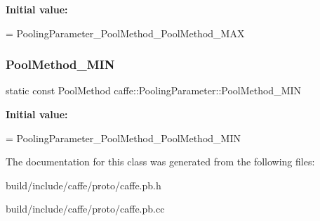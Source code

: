 {\bfseries Initial value\+:}
\begin{DoxyCode}
=
    PoolingParameter\_PoolMethod\_PoolMethod\_MAX
\end{DoxyCode}
\mbox{\label{classcaffe_1_1_pooling_parameter_a263d51c0e1eb5d2ec108c914bd408100}} 
\subsubsection{\texorpdfstring{Pool\+Method\+\_\+\+M\+IN}{PoolMethod\_MIN}}
{\footnotesize\ttfamily static const Pool\+Method caffe\+::\+Pooling\+Parameter\+::\+Pool\+Method\+\_\+\+M\+IN\hspace{0.3cm}{\ttfamily [static]}}

{\bfseries Initial value\+:}
\begin{DoxyCode}
=
    PoolingParameter\_PoolMethod\_PoolMethod\_MIN
\end{DoxyCode}


The documentation for this class was generated from the following files\+:\begin{DoxyCompactItemize}
\item 
build/include/caffe/proto/caffe.\+pb.\+h\item 
build/include/caffe/proto/caffe.\+pb.\+cc\end{DoxyCompactItemize}
